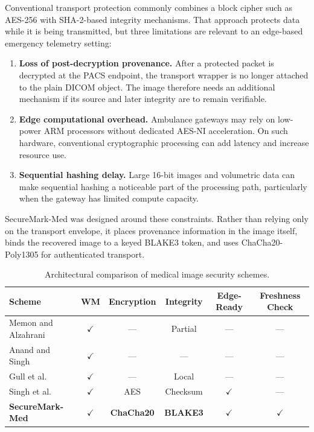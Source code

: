 \documentclass[runningheads]{llncs}
\begin{document}
Conventional transport protection commonly combines a block cipher such as AES-256 with SHA-2-based integrity mechanisms. That approach protects data while it is being transmitted, but three limitations are relevant to an edge-based emergency telemetry setting:
\begin{enumerate}
  \item \textbf{Loss of post-decryption provenance.} After a protected packet is decrypted at the PACS endpoint, the transport wrapper is no longer attached to the plain DICOM object. The image therefore needs an additional mechanism if its source and later integrity are to remain verifiable.
  \item \textbf{Edge computational overhead.} Ambulance gateways may rely on low-power ARM processors without dedicated AES-NI acceleration. On such hardware, conventional cryptographic processing can add latency and increase resource use.
  \item \textbf{Sequential hashing delay.} Large 16-bit images and volumetric data can make sequential hashing a noticeable part of the processing path, particularly when the gateway has limited compute capacity.
\end{enumerate}

SecureMark-Med was designed around these constraints. Rather than relying only on the transport envelope, it places provenance information in the image itself, binds the recovered image to a keyed BLAKE3 token, and uses ChaCha20-Poly1305 for authenticated transport.

\begin{table}[t]
\centering
\caption{Architectural comparison of medical image security schemes.}
\label{tab:comparison}
\small
\begin{tabular}{lccccc}
\hline
Scheme & WM & Encryption & Integrity & Edge-Ready & Freshness Check \\
\hline
Memon and Alzahrani \cite{memon2020prediction} & $\checkmark$ & --- & Partial & --- & --- \\
Anand and Singh \cite{anand2021health}     & $\checkmark$ & --- & ---      & --- & --- \\
Gull et al.\ \cite{gull2021self}         & $\checkmark$ & --- & Local    & --- & --- \\
Singh et al.\ \cite{singh2023robust}        & $\checkmark$ & AES & Checksum & $\checkmark$ & --- \\
\textbf{SecureMark-Med} & \textbf{$\checkmark$} & \textbf{ChaCha20} & \textbf{BLAKE3} & \textbf{$\checkmark$} & \textbf{$\checkmark$} \\
\hline
\end{tabular}
\end{table}
\end{document}
